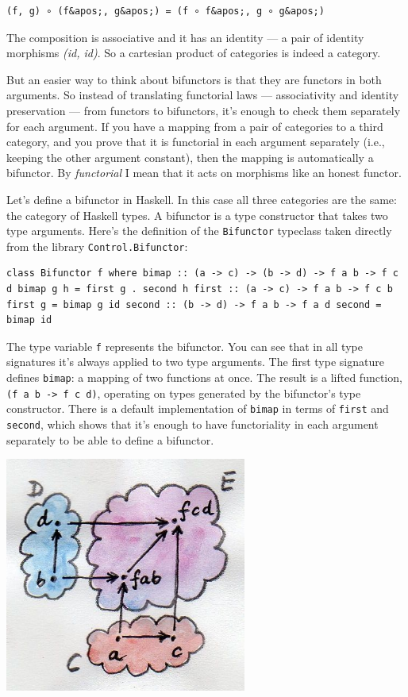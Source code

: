\begin{verbatim}
(f, g) ∘ (f&apos;, g&apos;) = (f ∘ f&apos;, g ∘ g&apos;)
\end{verbatim}

The composition is associative and it has an identity --- a pair of
identity morphisms \emph{(id, id)}. So a cartesian product of categories
is indeed a category.

But an easier way to think about bifunctors is that they are functors in
both arguments. So instead of translating functorial laws ---
associativity and identity preservation --- from functors to bifunctors,
it's enough to check them separately for each argument. If you have a
mapping from a pair of categories to a third category, and you prove
that it is functorial in each argument separately (i.e., keeping the
other argument constant), then the mapping is automatically a bifunctor.
By \emph{functorial} I mean that it acts on morphisms like an honest
functor.

Let's define a bifunctor in Haskell. In this case all three categories
are the same: the category of Haskell types. A bifunctor is a type
constructor that takes two type arguments. Here's the definition of the
\texttt{Bifunctor} typeclass taken directly from the library
\texttt{Control.Bifunctor}:

\begin{verbatim}
class Bifunctor f where bimap :: (a -> c) -> (b -> d) -> f a b -> f c d bimap g h = first g . second h first :: (a -> c) -> f a b -> f c b first g = bimap g id second :: (b -> d) -> f a b -> f a d second = bimap id
\end{verbatim}

The type variable \texttt{f} represents the bifunctor. You can see that
in all type signatures it's always applied to two type arguments. The
first type signature defines \texttt{bimap}: a mapping of two functions
at once. The result is a lifted function,
\texttt{(f\ a\ b\ -\textgreater{}\ f\ c\ d)}, operating on types
generated by the bifunctor's type constructor. There is a default
implementation of \texttt{bimap} in terms of \texttt{first} and
\texttt{second}, which shows that it's enough to have functoriality in
each argument separately to be able to define a bifunctor.

\hypertarget{attachment_4070}{}
\includegraphics[width=3.12500in]{images/bimap.jpg}

